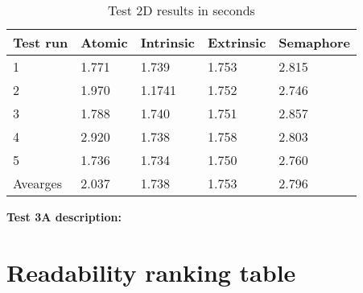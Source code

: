 \documentclass[11pt]{article}
\begin{document}
\begin{table}[H]
\centering
\caption{Test 2D results in seconds}
\label{tab:my-table}
\begin{tabular}{|l|l|l|l|l|}
\hline
Test run & Atomic & Intrinsic & Extrinsic & Semaphore \\ \hline
1        & 1.771  & 1.739     & 1.753     & 2.815     \\ \hline
2        & 1.970  & 1.1741     & 1.752     & 2.746     \\ \hline
3        & 1.788  & 1.740     & 1.751     & 2.857     \\ \hline
4        & 2.920  & 1.738     & 1.758     & 2.803     \\ \hline
5        & 1.736  & 1.734     & 1.750     & 2.760     \\ \hline
Avearges & 2.037  & 1.738     & 1.753     & 2.796     \\ \hline
\end{tabular}
\end{table}


\textbf{Test 3A description:}
\\


\section{Readability ranking table}
\end{document}
